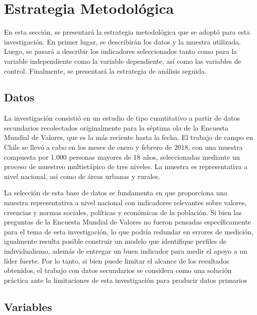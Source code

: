 \documentclass[12pt,oneside]{templates/facsothesis}
\begin{document}
\hypertarget{estrategia-metodoluxf3gica}{%
\chapter*{Estrategia Metodológica}\label{estrategia-metodoluxf3gica}}

En esta sección, se presentará la estrategia metodológica que se adoptó para esta investigación. En primer lugar, se describirán los datos y la muestra utilizada. Luego, se pasará a describir los indicadores seleccionados tanto como para la variable independiente como la variable dependiente, así como las variables de control. Finalmente, se presentará la estrategia de análisis seguida.

\hypertarget{datos}{%
\section*{Datos}\label{datos}}

La investigación consistió en un estudio de tipo cuantitativo a partir de datos secundarios recolectados originalmente para la séptima ola de la Encuesta Mundial de Valores, que es la más reciente hasta la fecha. El trabajo de campo en Chile se llevó a cabo en los meses de enero y febrero de 2018, con una muestra compuesta por 1.000 personas mayores de 18 años, seleccionadas mediante un proceso de muestreo multietápico de tres niveles. La muestra es representativa a nivel nacional, así como de áreas urbanas y rurales.

La selección de esta base de datos se fundamenta en que proporciona una muestra representativa a nivel nacional con indicadores relevantes sobre valores, creencias y normas sociales, políticas y económicas de la población. Si bien las preguntas de la Encuesta Mundial de Valores no fueron pensadas específicamente para el tema de esta investigación, lo que podría redundar en errores de medición, igualmente resulta posible construir un modelo que identifique perfiles de individualismo, además de entregar un buen indicador para medir el apoyo a un líder fuerte. Por lo tanto, si bien puede limitar el alcance de los resultados obtenidos, el trabajo con datos secundarios se considera como una solución práctica ante la limitaciones de esta investigación para producir datos primarios

\FloatBarrier

\hypertarget{variables}{%
\section*{Variables}\label{variables}}
\end{document}
